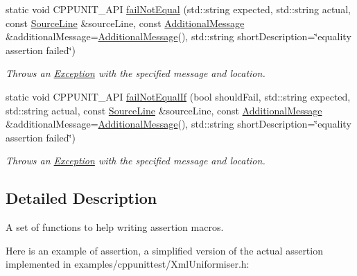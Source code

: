 \begin{DoxyCompactItemize}
\item 
static void C\+P\+P\+U\+N\+I\+T\+\_\+\+A\+PI \hyperlink{struct_asserter_ac6234767e7d986bace97dc44f8d80d6c}{fail\+Not\+Equal} (std\+::string expected, std\+::string actual, const \hyperlink{class_source_line}{Source\+Line} \&source\+Line, const \hyperlink{class_additional_message}{Additional\+Message} \&additional\+Message=\hyperlink{class_additional_message}{Additional\+Message}(), std\+::string short\+Description=\char`\"{}equality assertion failed\char`\"{})
\begin{DoxyCompactList}\small\item\em Throws an \hyperlink{class_exception}{Exception} with the specified message and location. \end{DoxyCompactList}\item 
static void C\+P\+P\+U\+N\+I\+T\+\_\+\+A\+PI \hyperlink{struct_asserter_a3a805c9f8c641d65353bcff2da80624f}{fail\+Not\+Equal\+If} (bool should\+Fail, std\+::string expected, std\+::string actual, const \hyperlink{class_source_line}{Source\+Line} \&source\+Line, const \hyperlink{class_additional_message}{Additional\+Message} \&additional\+Message=\hyperlink{class_additional_message}{Additional\+Message}(), std\+::string short\+Description=\char`\"{}equality assertion failed\char`\"{})
\begin{DoxyCompactList}\small\item\em Throws an \hyperlink{class_exception}{Exception} with the specified message and location. \end{DoxyCompactList}\end{DoxyCompactItemize}


\subsection{Detailed Description}
A set of functions to help writing assertion macros.

Here is an example of assertion, a simplified version of the actual assertion implemented in examples/cppunittest/\+Xml\+Uniformiser.\+h\+: 


